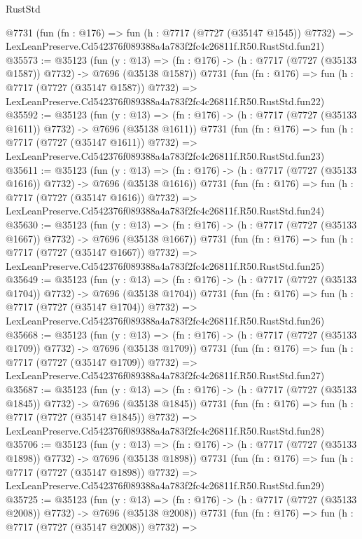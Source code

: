 \begin{lexlean}{RustStd}
\begin{coremodule}
    @7731
    (fun (fn : @176) =>
    fun (h : @7717 (@7727 (@35147 @1545)) @7732) =>
    LexLeanPreserve.Cd542376f089388a4a783f2fc4c26811f.R50.RustStd.fun21)
@35573 := @35123
    (fun (y : @13) =>
    (fn : @176) -> (h : @7717 (@7727 (@35133 @1587)) @7732) -> @7696 (@35138 @1587))
    @7731
    (fun (fn : @176) =>
    fun (h : @7717 (@7727 (@35147 @1587)) @7732) =>
    LexLeanPreserve.Cd542376f089388a4a783f2fc4c26811f.R50.RustStd.fun22)
@35592 := @35123
    (fun (y : @13) =>
    (fn : @176) -> (h : @7717 (@7727 (@35133 @1611)) @7732) -> @7696 (@35138 @1611))
    @7731
    (fun (fn : @176) =>
    fun (h : @7717 (@7727 (@35147 @1611)) @7732) =>
    LexLeanPreserve.Cd542376f089388a4a783f2fc4c26811f.R50.RustStd.fun23)
@35611 := @35123
    (fun (y : @13) =>
    (fn : @176) -> (h : @7717 (@7727 (@35133 @1616)) @7732) -> @7696 (@35138 @1616))
    @7731
    (fun (fn : @176) =>
    fun (h : @7717 (@7727 (@35147 @1616)) @7732) =>
    LexLeanPreserve.Cd542376f089388a4a783f2fc4c26811f.R50.RustStd.fun24)
@35630 := @35123
    (fun (y : @13) =>
    (fn : @176) -> (h : @7717 (@7727 (@35133 @1667)) @7732) -> @7696 (@35138 @1667))
    @7731
    (fun (fn : @176) =>
    fun (h : @7717 (@7727 (@35147 @1667)) @7732) =>
    LexLeanPreserve.Cd542376f089388a4a783f2fc4c26811f.R50.RustStd.fun25)
@35649 := @35123
    (fun (y : @13) =>
    (fn : @176) -> (h : @7717 (@7727 (@35133 @1704)) @7732) -> @7696 (@35138 @1704))
    @7731
    (fun (fn : @176) =>
    fun (h : @7717 (@7727 (@35147 @1704)) @7732) =>
    LexLeanPreserve.Cd542376f089388a4a783f2fc4c26811f.R50.RustStd.fun26)
@35668 := @35123
    (fun (y : @13) =>
    (fn : @176) -> (h : @7717 (@7727 (@35133 @1709)) @7732) -> @7696 (@35138 @1709))
    @7731
    (fun (fn : @176) =>
    fun (h : @7717 (@7727 (@35147 @1709)) @7732) =>
    LexLeanPreserve.Cd542376f089388a4a783f2fc4c26811f.R50.RustStd.fun27)
@35687 := @35123
    (fun (y : @13) =>
    (fn : @176) -> (h : @7717 (@7727 (@35133 @1845)) @7732) -> @7696 (@35138 @1845))
    @7731
    (fun (fn : @176) =>
    fun (h : @7717 (@7727 (@35147 @1845)) @7732) =>
    LexLeanPreserve.Cd542376f089388a4a783f2fc4c26811f.R50.RustStd.fun28)
@35706 := @35123
    (fun (y : @13) =>
    (fn : @176) -> (h : @7717 (@7727 (@35133 @1898)) @7732) -> @7696 (@35138 @1898))
    @7731
    (fun (fn : @176) =>
    fun (h : @7717 (@7727 (@35147 @1898)) @7732) =>
    LexLeanPreserve.Cd542376f089388a4a783f2fc4c26811f.R50.RustStd.fun29)
@35725 := @35123
    (fun (y : @13) =>
    (fn : @176) -> (h : @7717 (@7727 (@35133 @2008)) @7732) -> @7696 (@35138 @2008))
    @7731
    (fun (fn : @176) =>
    fun (h : @7717 (@7727 (@35147 @2008)) @7732) =>

\end{coremodule}
\end{lexlean}
